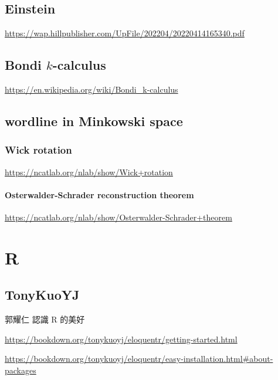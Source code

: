 \documentclass[
]{book}
\theoremstyle{definition}
\theoremstyle{definition}
\theoremstyle{definition}
\theoremstyle{definition}
\theoremstyle{remark}
\begin{document}
\section{Einstein}\label{einstein}

\url{https://wap.hillpublisher.com/UpFile/202204/20220414165340.pdf}

\section{\texorpdfstring{Bondi \(k\)-calculus}{Bondi k-calculus}}\label{bondi-k-calculus}

\url{https://en.wikipedia.org/wiki/Bondi_k-calculus}

\section{wordline in Minkowski space}\label{wordline-in-minkowski-space}

\subsection{Wick rotation}\label{wick-rotation}

\url{https://ncatlab.org/nlab/show/Wick+rotation}

\subsubsection{Osterwalder-Schrader reconstruction theorem}\label{osterwalder-schrader-reconstruction-theorem}

\url{https://ncatlab.org/nlab/show/Osterwalder-Schrader+theorem}

\chapter{R}\label{r}

\section{TonyKuoYJ}\label{tonykuoyj}

\begin{CJK}{UTF8}{bsmi}
郭耀仁 認識 R 的美好
\end{CJK}

\url{https://bookdown.org/tonykuoyj/eloquentr/getting-started.html}

\url{https://bookdown.org/tonykuoyj/eloquentr/easy-installation.html\#about-packages}
\end{document}
